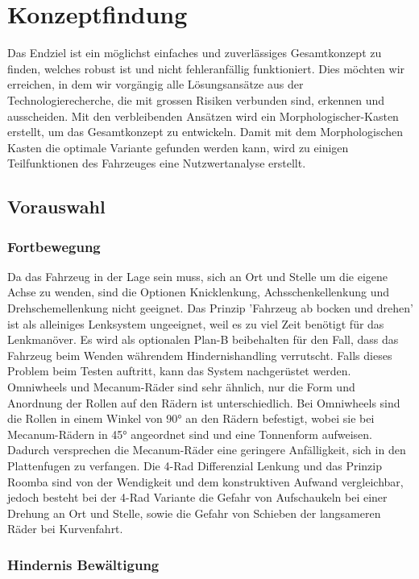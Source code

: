 \documentclass[../main.tex]{subfiles}
\begin{document}
\newpage
\section{Konzeptfindung}

Das Endziel ist ein möglichst einfaches und zuverlässiges Gesamtkonzept zu finden, welches robust ist und nicht fehleranfällig funktioniert. Dies möchten wir erreichen, in dem wir vorgängig alle Lösungsansätze aus der Technologierecherche, die mit grossen Risiken verbunden sind, erkennen und ausscheiden. Mit den verbleibenden Ansätzen wird ein Morphologischer-Kasten erstellt, um das Gesamtkonzept zu entwickeln. Damit mit dem Morphologischen Kasten die optimale Variante gefunden werden kann, wird zu einigen Teilfunktionen des Fahrzeuges eine Nutzwertanalyse erstellt.

\subsection{Vorauswahl}
    \subsubsection{Fortbewegung}
    Da das Fahrzeug in der Lage sein muss, sich an Ort und Stelle um die eigene Achse zu wenden, sind die Optionen Knicklenkung, Achsschenkellenkung und Drehschemellenkung nicht geeignet.
    Das Prinzip 'Fahrzeug ab bocken und drehen' ist als alleiniges Lenksystem ungeeignet, weil es zu viel Zeit benötigt für das Lenkmanöver. Es wird als optionalen Plan-B beibehalten für den Fall, dass das Fahrzeug beim Wenden währendem Hindernishandling verrutscht. Falls dieses Problem beim Testen auftritt, kann das System nachgerüstet werden.
    Omniwheels und Mecanum-Räder sind sehr ähnlich, nur die Form und Anordnung der Rollen auf den Rädern ist unterschiedlich. Bei Omniwheels sind die Rollen in einem Winkel von 90° an den Rädern befestigt, wobei sie bei Mecanum-Rädern in 45° angeordnet sind und eine Tonnenform aufweisen. Dadurch versprechen die Mecanum-Räder eine geringere Anfälligkeit, sich in den Plattenfugen zu verfangen. Die 4-Rad Differenzial Lenkung und das Prinzip Roomba sind von der Wendigkeit und dem konstruktiven Aufwand vergleichbar, jedoch besteht bei der 4-Rad Variante die Gefahr von Aufschaukeln bei einer Drehung an Ort und Stelle, sowie die Gefahr von Schieben der langsameren Räder bei Kurvenfahrt.
        
    \newpage
    \subsubsection{Hindernis Bewältigung}
\end{document}
